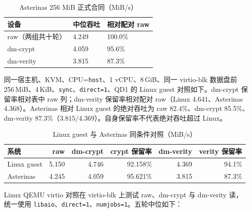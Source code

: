 \begin{table}[H]
    \centering
    \caption{Asterinas 256 MiB 正式合同（MiB/s）}
    \begin{tabular}{p{}p{}p{}}
        \toprule
        \textbf{设备} & \textbf{中位吞吐} & \textbf{相对配对 raw} \\
        \midrule
        raw（两组共十轮） & 4.249 & 100.0\% \\
        dm-crypt & 4.059 & 95.6\% \\
        dm-verity & 3.815 & 87.3\% \\
        \bottomrule
    \end{tabular}
\end{table}

同一宿主机、KVM、CPU=\texttt{host}、1 vCPU、8\,GiB、同一 virtio-blk 数据盘前 256\,MiB、4\,KiB、\texttt{sync}、\texttt{direct=1}、QD1 的 Linux guest 对照如下。dm-crypt 保留率相对表中 raw 列；dm-verity 保留率相对配对 raw（Linux 4.641、Asterinas 4.368）。Asterinas 相对 Linux guest 的绝对吞吐为 raw 82.4\%、dm-crypt 85.5\%、dm-verity 87.3\%（$3.815/4.369$）。自身保留率不代表绝对吞吐超过 Linux。

\begin{table}[H]
    \centering
    \small
    \caption{Linux guest 与 Asterinas 同条件对照（MiB/s）}
    \begin{tabular}{lrrrrr}
        \toprule
        \textbf{系统} & \textbf{raw} & \textbf{dm-crypt} & \textbf{crypt 保留率} & \textbf{dm-verity} & \textbf{verity 保留率} \\
        \midrule
        Linux guest & 5.150 & 4.746 & 92.158\% & 4.369 & 94.1\% \\
        Asterinas & 4.245 & 4.059 & 95.621\% & 3.815 & 87.3\% \\
        \bottomrule
    \end{tabular}
\end{table}

Linux QEMU virtio 对照在 virtio-blk 上测试 raw、dm-crypt 与 dm-verity 读，
统一使用 \texttt{libaio}、\texttt{direct=1}、\texttt{numjobs=1}。五轮中位如下：

